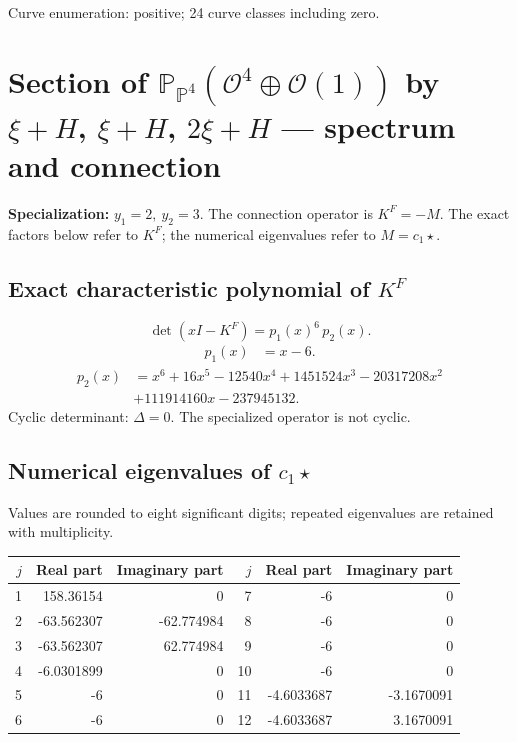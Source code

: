 \documentclass[10pt,a4paper]{article}
\begin{document}
Curve enumeration: positive; 24 curve classes including zero.
\clearpage\section*{Section of $\mathbb P_{\mathbb P^{4}}(\mathcal O^{4}\oplus \mathcal O(1))$ by $\xi +H$, $\xi +H$, $2\xi +H$ --- spectrum and connection}
\textbf{Specialization:} $y_1=2,\ y_2=3$. The connection operator is $K^F=-M$. The exact factors below refer to $K^F$; the numerical eigenvalues refer to $M=c_1\star$.
\subsection*{Exact characteristic polynomial of $K^F$}
\[\det(xI-K^F)=p_{1}(x)^{6}\,p_{2}(x).\]
\[\begin{aligned}p_{1}(x)&=x - 6.\end{aligned}\]
\[\begin{aligned}p_{2}(x)&=x^{6} + 16 x^{5} - 12540 x^{4} + 1451524 x^{3} - 20317208 x^{2}\\&+111914160 x - 237945132.\end{aligned}\]
Cyclic determinant: $\Delta=0$. The specialized operator is not cyclic.
\subsection*{Numerical eigenvalues of $c_1\star$}
Values are rounded to eight significant digits; repeated eigenvalues are retained with multiplicity.
\begin{center}\small\begin{tabular}{rrr@{\qquad}rrr}\toprule $j$ & Real part & Imaginary part & $j$ & Real part & Imaginary part\\\midrule
1 & 158.36154 & 0 & 7 & -6 & 0\\
2 & -63.562307 & -62.774984 & 8 & -6 & 0\\
3 & -63.562307 & 62.774984 & 9 & -6 & 0\\
4 & -6.0301899 & 0 & 10 & -6 & 0\\
5 & -6 & 0 & 11 & -4.6033687 & -3.1670091\\
6 & -6 & 0 & 12 & -4.6033687 & 3.1670091\\
\bottomrule\end{tabular}\end{center}
\end{document}
